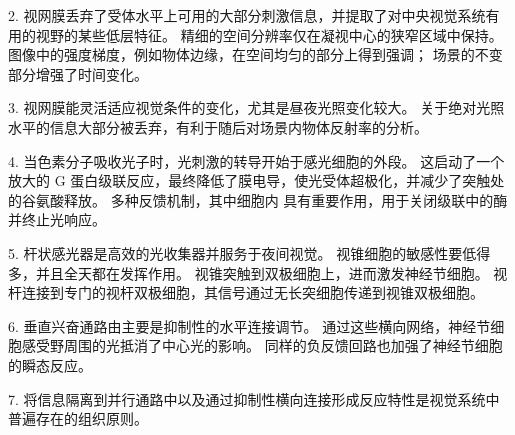 2. 视网膜丢弃了受体水平上可用的大部分刺激信息，并提取了对中央视觉系统有用的视野的某些低层特征。
精细的空间分辨率仅在凝视中心的狭窄区域中保持。
图像中的强度梯度，例如物体边缘，在空间均匀的部分上得到强调；
场景的不变部分增强了时间变化。


3. 视网膜能灵活适应视觉条件的变化，尤其是昼夜光照变化较大。
关于绝对光照水平的信息大部分被丢弃，有利于随后对场景内物体反射率的分析。 


4. 当色素分子吸收光子时，光刺激的转导开始于感光细胞的外段。
这启动了一个放大的 G 蛋白级联反应，最终降低了膜电导，使光受体超极化，并减少了突触处的谷氨酸释放。 
多种反馈机制，其中细胞内  具有重要作用，用于关闭级联中的酶并终止光响应。 


5. 杆状感光器是高效的光收集器并服务于夜间视觉。
视锥细胞的敏感性要低得多，并且全天都在发挥作用。
视锥突触到双极细胞上，进而激发神经节细胞。
视杆连接到专门的视杆双极细胞，其信号通过无长突细胞传递到视锥双极细胞。 


6. 垂直兴奋通路由主要是抑制性的水平连接调节。
通过这些横向网络，神经节细胞感受野周围的光抵消了中心光的影响。
同样的负反馈回路也加强了神经节细胞的瞬态反应。


7. 将信息隔离到并行通路中以及通过抑制性横向连接形成反应特性是视觉系统中普遍存在的组织原则。


